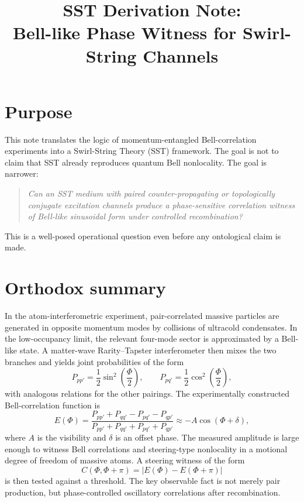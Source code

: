 \documentclass[11pt]{article}
\title{SST Derivation Note:\\
Bell-like Phase Witness for Swirl-String Channels}
\author{}
\date{}
\begin{document}
    \maketitle
    
    \section{Purpose}
        
        This note translates the logic of momentum-entangled Bell-correlation experiments into a Swirl-String Theory (SST) framework. The goal is not to claim that SST already reproduces quantum Bell nonlocality. The goal is narrower:
        
        \begin{quote}
            \emph{Can an SST medium with paired counter-propagating or topologically conjugate excitation channels produce a phase-sensitive correlation witness of Bell-like sinusoidal form under controlled recombination?}
        \end{quote}
        
        This is a well-posed operational question even before any ontological claim is made.
    
    \section{Orthodox summary}
        
        In the atom-interferometric experiment, pair-correlated massive particles are generated in opposite momentum modes by collisions of ultracold condensates. In the low-occupancy limit, the relevant four-mode sector is approximated by a Bell-like state. A matter-wave Rarity--Tapster interferometer then mixes the two branches and yields joint probabilities of the form
        \begin{equation}
            P_{pp'}=\frac{1}{2}\sin^2\!\left(\frac{\Phi}{2}\right),\qquad
            P_{pq'}=\frac{1}{2}\cos^2\!\left(\frac{\Phi}{2}\right),
            \label{eq:orthodox_probs}
        \end{equation}
        with analogous relations for the other pairings. The experimentally constructed Bell-correlation function is
        \begin{equation}
            E(\Phi)=
            \frac{P_{pp'}+P_{qq'}-P_{pq'}-P_{qp'}}
            {P_{pp'}+P_{qq'}+P_{pq'}+P_{qp'}}
            \approx -A\cos(\Phi+\delta),
            \label{eq:orthodox_E}
        \end{equation}
        where \(A\) is the visibility and \(\delta\) is an offset phase. The measured amplitude is large enough to witness Bell correlations and steering-type nonlocality in a motional degree of freedom of massive atoms. A steering witness of the form
        \begin{equation}
            C(\Phi,\Phi+\pi)=|E(\Phi)-E(\Phi+\pi)|
            \label{eq:orthodox_C}
        \end{equation}
        is then tested against a threshold. The key observable fact is not merely pair production, but phase-controlled oscillatory correlations after recombination.
    
\end{document}

